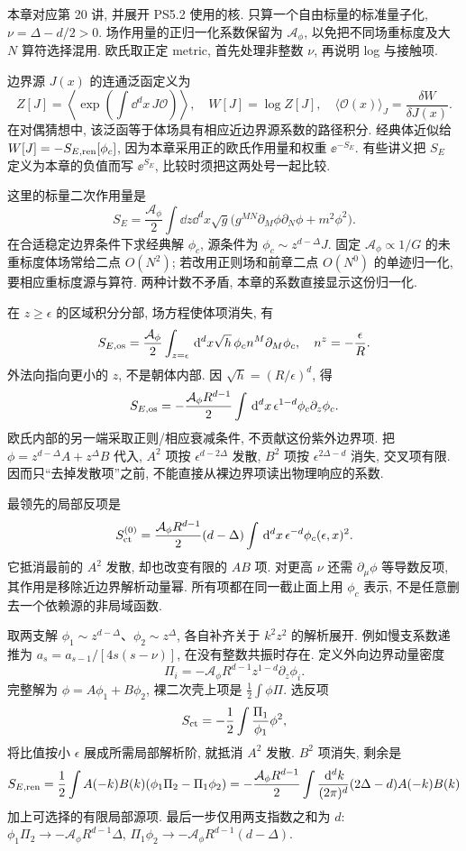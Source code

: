 本章对应第 20 讲, 并展开 PS5.2 使用的核. 只算一个自由标量的标准量子化, $\nu=\Delta-d/2>0$. 场作用量的正归一化系数保留为 $\mathcal A_\phi$, 以免把不同场重标度及大 $N$ 算符选择混用. 欧氏取正定 metric, 首先处理非整数 $\nu$, 再说明 log 与接触项.

边界源 $J(x)$ 的连通泛函定义为
\[
Z[J]=\left\langle\exp\left(\int\dd^dx\,J\mathcal O\right)\right\rangle,
\quad W[J]=\log Z[J],
\quad\langle\mathcal O(x)\rangle_J=\frac{\delta W}{\delta J(x)}.
\]
在对偶猜想中, 该泛函等于体场具有相应近边界源系数的路径积分. 经典体近似给 $W[J]=-S_{E,\rm ren}[\phi_c]$, 因为本章采用正的欧氏作用量和权重 $\ee^{-S_E}$. 有些讲义把 $S_E$ 定义为本章的负值而写 $\ee^{S_E}$, 比较时须把这两处号一起比较.

这里的标量二次作用量是
\[
S_E=\frac{\mathcal A_\phi}2\int\dd z\dd^dx\sqrt g
\bigl(g^{MN}\partial_M\phi\partial_N\phi+m^2\phi^2\bigr).
\]
在合适稳定边界条件下求经典解 $\phi_c$, 源条件为 $\phi_c\sim z^{d-\Delta}J$. 固定 $\mathcal A_\phi\propto1/G$ 的未重标度体场常给二点 $O(N^2)$; 若改用正则场和前章二点 $O(N^0)$ 的单迹归一化, 要相应重标度源与算符. 两种计数不矛盾, 本章的系数直接显示这份归一化.

在 $z\ge\epsilon$ 的区域积分分部, 场方程使体项消失, 有
\[
S_{E,\rm os}=\frac{\mathcal A_\phi}2
\int_{z=\epsilon}\,\mathrm d^dx\sqrt h\,\phi_c n^M\partial_M\phi_c,
\quad n^z=-\frac\epsilon R.
\]
外法向指向更小的 $z$, 不是朝体内部. 因 $\sqrt h=(R/\epsilon)^d$, 得
\[
S_{E,\rm os}=-\frac{\mathcal A_\phi R^{d-1}}2
\int\,\mathrm d^dx\,\epsilon^{1-d}\phi_c\partial_z\phi_c.
\]
欧氏内部的另一端采取正则/相应衰减条件, 不贡献这份紫外边界项. 把 $\phi=z^{d-\Delta}A+z^\Delta B$ 代入, $A^2$ 项按 $\epsilon^{d-2\Delta}$ 发散, $B^2$ 项按 $\epsilon^{2\Delta-d}$ 消失, 交叉项有限. 因而只“去掉发散项”之前, 不能直接从裸边界项读出物理响应的系数.

最领先的局部反项是
\[
S_{\rm ct}^{(0)}=\frac{\mathcal A_\phi R^{d-1}}2
(d-\Delta)\int\,\mathrm d^dx\,\epsilon^{-d}\phi_c(\epsilon,x)^2.
\]
它抵消最前的 $A^2$ 发散, 却也改变有限的 $AB$ 项. 对更高 $\nu$ 还需 $\partial_\mu\phi$ 等导数反项, 其作用是移除近边界解析动量幂. 所有项都在同一截止面上用 $\phi_c$ 表示, 不是任意删去一个依赖源的非局域函数.

取两支解 $\phi_1\sim z^{d-\Delta}$、$\phi_2\sim z^\Delta$, 各自补齐关于 $k^2z^2$ 的解析展开. 例如慢支系数递推为 $a_s=a_{s-1}/[4s(s-\nu)]$, 在没有整数共振时存在. 定义外向边界动量密度
\[
\Pi_i=-\mathcal A_\phi R^{d-1}z^{1-d}\partial_z\phi_i.
\]
完整解为 $\phi=A\phi_1+B\phi_2$, 裸二次壳上项是 $\tfrac12\int\phi\Pi$. 选反项
\[
S_{\rm ct}=-\frac12\int\frac{\Pi_1}{\phi_1}\phi^2,
\]
将比值按小 $\epsilon$ 展成所需局部解析阶, 就抵消 $A^2$ 发散. $B^2$ 项消失, 剩余是
\[
S_{E,\rm ren}=\frac12\int A(-k)B(k)
(\phi_1\Pi_2-\Pi_1\phi_2)
=-\frac{\mathcal A_\phi R^{d-1}}2
\int\frac{\,\mathrm d^dk}{(2\pi)^d}(2\Delta-d)A(-k)B(k)
\]
加上可选择的有限局部源项. 最后一步仅用两支指数之和为 $d$: $\phi_1\Pi_2\to-\mathcal A_\phi R^{d-1}\Delta$, $\Pi_1\phi_2\to-\mathcal A_\phi R^{d-1}(d-\Delta)$.

